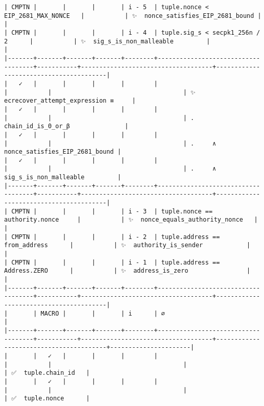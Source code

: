 \documentclass[varwidth=\maxdimen,margin=0.5cm,multi={verbatim}]{standalone}
\begin{document}
\begin{verbatim}
| CMPTN |       |       |       | i - 5  | tuple.nonce < EIP_2681_MAX_NONCE   |           | ✨  nonce_satisfies_EIP_2681_bound |                                        |
| CMPTN |       |       |       | i - 4  | tuple.sig_s < secpk1_256n / 2      |           | ✨  sig_s_is_non_malleable         |                                        |
|-------+-------+-------+-------+--------+------------------------------------+-----------+------------------------------------+----------------------------------------|
|   ✓   |       |       |       |        |                                    |           |                                    | ✨  ecrecover_attempt_expression ≡     |
|   ✓   |       |       |       |        |                                    |           |                                    | .     chain_id_is_0_or_β               |
|   ✓   |       |       |       |        |                                    |           |                                    | .     ∧ nonce_satisfies_EIP_2681_bound |
|   ✓   |       |       |       |        |                                    |           |                                    | .     ∧ sig_s_is_non_malleable         |
|-------+-------+-------+-------+--------+------------------------------------+-----------+------------------------------------+----------------------------------------|
| CMPTN |       |       |       | i - 3  | tuple.nonce == authority.nonce     |           | ✨  nonce_equals_authority_nonce   |                                        |
| CMPTN |       |       |       | i - 2  | tuple.address == from_address      |           | ✨  authority_is_sender            |                                        |
| CMPTN |       |       |       | i - 1  | tuple.address == Address.ZERO      |           | ✨  address_is_zero                |                                        |
|-------+-------+-------+-------+--------+------------------------------------+-----------+------------------------------------+----------------------------------------|
|       | MACRO |       |       | i      | ∅                                  |
|-------+-------+-------+-------+--------+------------------------------------+-----------+------------------------------------+----------------------------------------+----------------------|
|       |   ✓   |       |       |        |                                    |           |                                    |                                        | ✅  tuple.chain_id   |
|       |   ✓   |       |       |        |                                    |           |                                    |                                        | ✅  tuple.nonce      |

\end{verbatim}
\end{document}
